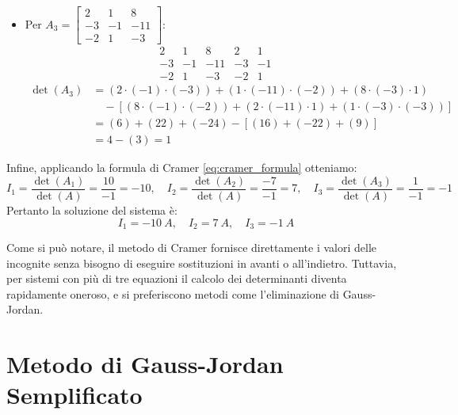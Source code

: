 \begin{itemize}
\item Per \(A_3 = \begin{bmatrix} 2 & 1 & 8 \\ -3 & -1 & -11 \\ -2 & 1 & -3 \end{bmatrix}\):
\[
\begin{array}{ccc|cc}
2 & 1 & 8 & 2 & 1 \\
-3 & -1 & -11 & -3 & -1 \\
-2 & 1 & -3 & -2 & 1
\end{array}
\]
\begin{align}
\det(A_3) &= (2 \cdot (-1) \cdot (-3)) + (1 \cdot (-11) \cdot (-2)) + (8 \cdot (-3) \cdot 1) \nonumber \\
          &\quad - [(8 \cdot (-1) \cdot (-2)) + (2 \cdot (-11) \cdot 1) + (1 \cdot (-3) \cdot (-3))] \nonumber \\
          &= (6) + (22) + (-24) - [(16) + (-22) + (9)] \nonumber \\
          &= 4 - (3) = 1
\label{eq:detA3_3x3}
\end{align}
\end{itemize}

Infine, applicando la formula di Cramer \eqref{eq:cramer_formula} otteniamo:
\begin{equation}
I_1 = \frac{\det(A_1)}{\det(A)} = \frac{10}{-1} = -10,\quad
I_2 = \frac{\det(A_2)}{\det(A)} = \frac{-7}{-1} = 7,\quad
I_3 = \frac{\det(A_3)}{\det(A)} = \frac{1}{-1} = -1
\label{eq:soluzione_3x3}
\end{equation}
Pertanto la soluzione del sistema è:
\begin{equation}
I_1 = \SI{-10}{A},\quad I_2 = \SI{7}{A},\quad I_3 = \SI{-1}{A}
\label{eq:soluzione_3x2_valori}
\end{equation}

Come si può notare, il metodo di Cramer fornisce direttamente i valori delle incognite senza bisogno di eseguire sostituzioni in avanti o all'indietro. Tuttavia, per sistemi con più di tre equazioni il calcolo dei determinanti diventa rapidamente oneroso, e si preferiscono metodi come l'eliminazione di Gauss-Jordan.


\section{Metodo di Gauss-Jordan Semplificato}

